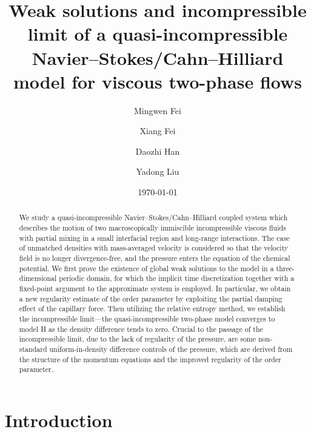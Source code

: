 \documentclass[reqno,a4paper,11pt]{amsart}
\title[Quasi-incompressible Navier--Stokes/Cahn--Hilliard]{Weak solutions and incompressible limit of a quasi-incompressible Navier--Stokes/Cahn--Hilliard model for viscous two-phase flows}
\author{Mingwen Fei}
\author{Xiang Fei}
\author{Daozhi Han}
\author{Yadong Liu}
\date{\today}
\theoremstyle{plain}
\numberwithin{equation}{section}
\begin{document}
	\begin{abstract}
		We study a quasi-incompressible Navier--Stokes/Cahn--Hilliard coupled system which describes the motion of two macroscopically immiscible incompressible viscous fluids with partial mixing in a small interfacial region and long-range interactions. The case of unmatched densities with mass-averaged velocity is considered so that the velocity field is no longer divergence-free, and the pressure enters the equation of the chemical potential.
		We first prove the existence of global weak solutions to the model in a three-dimensional periodic domain, for which the implicit time discretization together with a fixed-point argument to the approximate system is employed. In particular, we obtain a new regularity estimate of the order parameter by exploiting the partial damping effect of the capillary force. Then utilizing the relative entropy method, we establish the incompressible limit---the quasi-incompressible two-phase model converges to model H as the density difference tends to zero. Crucial to the passage of the incompressible limit, due to the lack of regularity of the pressure, are some non-standard uniform-in-density difference controls of the pressure, which are derived from the structure of the momentum equations and the improved regularity of the order parameter.
	\end{abstract}
	
	\maketitle
	
	
	\section{Introduction}
	\label{sec:introduction}
	
\end{document}
